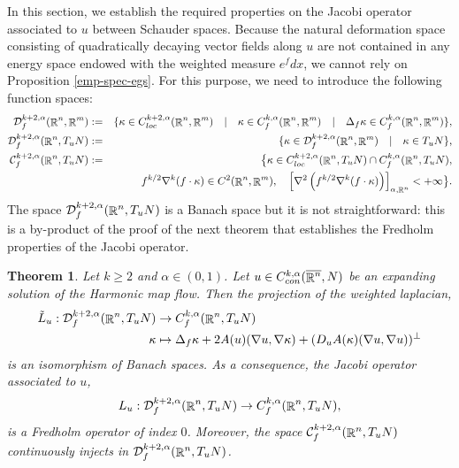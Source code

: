 \documentclass[a4paper,11pt,reqno]{amsart}
\newtheorem{theo}[defn]{Theorem}
\def\R{\mathop{\rm \mathbb{R}}\nolimits}
\begin{document}
In this section, we establish the required properties on the Jacobi operator associated to $u$ between Schauder spaces. Because the natural deformation space consisting of quadratically decaying vector fields along $u$ are not contained in any energy space endowed with the weighted measure $e^fdx$, we cannot rely on Proposition \ref{emp-spec-egs}. For this purpose, we need to introduce the following function spaces:
\begin{eqnarray*}
\mathcal{D}_f^{k+2,\alpha}(\R^n,\R^m)&:=&\{\kappa\in C^{k+2,\alpha}_{loc}(\R^n,\R^m)\quad|\quad\kappa\in C_f^{k,\alpha}(\R^n,\R^m)\quad|\quad \Delta_f \kappa\in C_f^{k,\alpha}(\R^n,\R^m)\},\\
\mathcal{D}_f^{k+2,\alpha}(\R^n,T_uN)&:=&\{\kappa\in \mathcal{D}_f^{k+2,\alpha}(\R^n,\R^m)\quad|\quad \text{$\kappa\in T_uN$}\},\\
\mathcal{C}_f^{k+2,\alpha}(\R^n,T_uN)&:=&\big\{\kappa\in C^{k+2,\alpha}_{loc}(\R^n,T_uN)\cap C^{k,\alpha}_f(\R^n,T_uN),\\
&& f^{k/2}\nabla^k(f\cdot\kappa)\in C^{2}(\R^n,\R^m),\quad \left[\nabla^2\left(f^{k/2}\nabla^k(f\cdot\kappa)\right)\right]_{\alpha,\R^n}<+\infty\big\}.
\end{eqnarray*}
The space $\mathcal{D}_f^{k+2,\alpha}(\R^n,T_uN)$ is a Banach space but it is not straightforward: this is a by-product of the proof of the next theorem that establishes the Fredholm properties of the Jacobi operator.
\begin{theo}\label{theo-fred-prop-jac-op}
Let $k\geq 2$ and $\alpha\in(0,1)$. Let $u\in C_{con}^{k,\alpha}(\overline{\R^n},N)$ be an expanding solution of the Harmonic map flow. Then the projection of the weighted laplacian, 
\begin{align*}
\tilde{L}_u:\mathcal{D}_f^{k+2,\alpha}(\R^n,T_uN) &\rightarrow C_f^{k,\alpha}(\R^n,T_uN)\\
\kappa&\mapsto \Delta_f\kappa+2A(u)(\nabla u,\nabla\kappa)+(D_uA(\kappa)(\nabla u,\nabla u))^{\perp}
\end{align*}
 is an isomorphism of Banach spaces. As a consequence, the Jacobi operator associated to $u$, $$L_u: \mathcal{D}_f^{k+2,\alpha}(\R^n,T_uN)\rightarrow C_f^{k,\alpha}(\R^n,T_uN),$$ is a Fredholm operator of index $0$. Moreover, the space $\mathcal{C}^{k+2,\alpha}_f(\R^n,T_uN)$ continuously injects in $\mathcal{D}_f^{k+2,\alpha}(\R^n,T_uN)$.
\end{theo}
\end{document}
